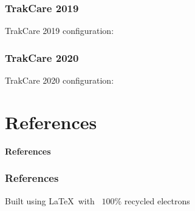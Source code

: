 \documentclass[12pt,landscape]{beamer}
\begin{document}
\begin{frame}
  \frametitle{TrakCare 2019}

TrakCare 2019 configuration:



\end{frame}

\begin{frame}
  \frametitle{TrakCare 2020}

TrakCare 2020 configuration:



\end{frame}


\section{References}

\begin{frame}
 \textbf{References}
\end{frame}

\begin{frame}[allowframebreaks]
 \frametitle{References}
 
 
\end{frame}

\begin{frame}
  \tiny
  Built using \LaTeX\ with \ $100\%$ recycled electrons
\end{frame}
\end{document}
